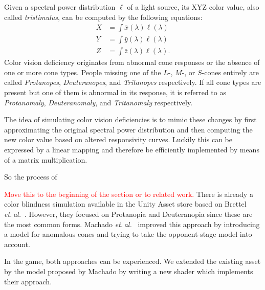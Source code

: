 \documentclass{sig-alternate-05-2015}
\newcommand{\todo}[1]{\textcolor{Red}{#1}}
\newcommand{\etal}{\textit{et. al.}}
\begin{document}
Given a spectral power distribution $\ell$ of a light source, its XYZ color value, also called \emph{tristimulus}, can be computed by the following equations:
\begin{eqnarray}
    X &= \int\bar x(\lambda) \ell(\lambda) \\
    Y &= \int\bar y(\lambda) \ell(\lambda) \\
    Z &= \int\bar z(\lambda) \ell(\lambda).
\end{eqnarray}
%
Color vision deficiency originates from abnormal cone responses or the absence of one or more cone types.
People missing one of the $L$-, $M$-, or $S$-cones entirely are called \emph{Protanopes}, \emph{Deuteranopes}, and \emph{Tritanopes} respectively.
If all cone types are present but one of them is abnormal in its response, it is referred to as \emph{Protanomaly}, \emph{Deuteranomaly}, and \emph{Tritanomaly} respectively.

The idea of simulating color vision deficiencies is to mimic these changes by first approximating the original spectral power distribution and then computing the new color value based on altered responsivity curves.
Luckily this can be expressed by a linear mapping and therefore be efficiently implemented by means of a matrix multiplication.

So the process of 

\todo{Move this to the beginning of the section or to related work.}
There is already a color blindness simulation available in the Unity Asset store based on Brettel \etal~\cite{brettel}.
However, they focused on Protanopia and Deuteranopia since these are the most common forms.
Machado \etal~\cite{Machado2009} improved this approach by introducing a model for anomalous cones and trying to take the opponent-stage model into account.

In the game, both approaches can be experienced.
We extended the existing asset by the model proposed by Machado by writing a new shader which implements their approach.

\end{document}
